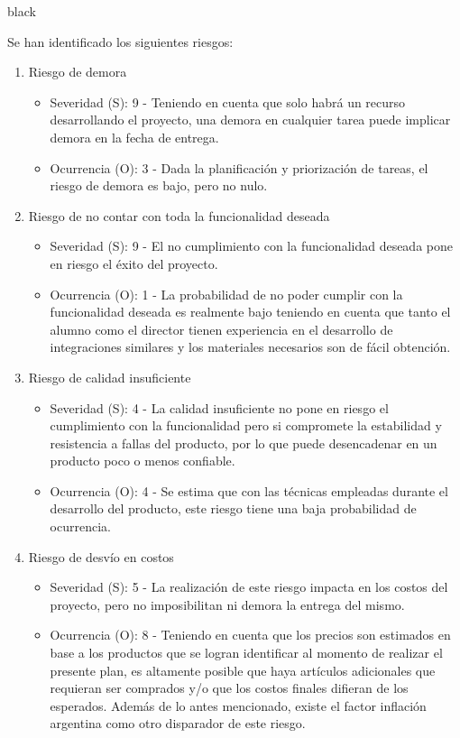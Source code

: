 \documentclass[
11pt, %
codirector, %
]{charter}
\begin{document}
\begin{consigna}{black}

Se han identificado los siguientes riesgos:


\begin{enumerate}

\item Riesgo de demora
\begin{itemize}
	\item Severidad (S): 9 - Teniendo en cuenta que solo habrá un recurso desarrollando el proyecto, una demora en cualquier tarea puede implicar demora en la fecha de entrega.
	\item Ocurrencia (O): 3 - Dada la planificación y priorización de tareas, el riesgo de demora es bajo, pero no nulo.
\end{itemize}


\item Riesgo de no contar con toda la funcionalidad deseada
\begin{itemize}
	\item Severidad (S): 9 - El no cumplimiento con la funcionalidad deseada pone en riesgo el éxito del proyecto.
	\item Ocurrencia (O): 1 - La probabilidad de no poder cumplir con la funcionalidad deseada es realmente bajo teniendo en cuenta que tanto el alumno como el director tienen experiencia en el desarrollo de integraciones similares y los materiales necesarios son de fácil obtención.
\end{itemize}

\item Riesgo de calidad insuficiente
\begin{itemize}
	\item Severidad (S): 4 - La calidad insuficiente no pone en riesgo el cumplimiento con la funcionalidad pero si compromete la estabilidad y resistencia a fallas del producto, por lo que puede desencadenar en un producto poco o menos confiable.
	\item Ocurrencia (O): 4 - Se estima que con las técnicas empleadas durante el desarrollo del producto, este riesgo tiene una baja probabilidad de ocurrencia.
\end{itemize}


\item Riesgo de desvío en costos
\begin{itemize}
	\item Severidad (S): 5 - La realización de este riesgo impacta en los costos del proyecto, pero no imposibilitan ni demora la entrega del mismo.
	\item Ocurrencia (O): 8 - Teniendo en cuenta que los precios son estimados en base a los productos que se logran identificar al momento de realizar el presente plan, es altamente posible que haya artículos adicionales que requieran ser comprados y/o que los costos finales difieran de los esperados. Además de lo antes mencionado, existe el factor inflación argentina como otro disparador de este riesgo.
\end{itemize}


\end{enumerate}
\end{consigna}
\end{document}
